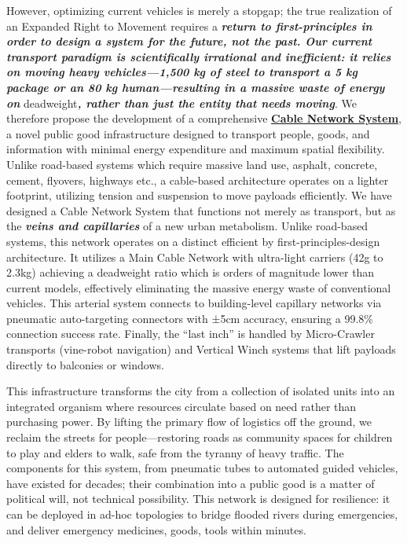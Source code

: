 However, optimizing current vehicles is merely a stopgap; the true
realization of an Expanded Right to Movement requires a
\textbf{\emph{return to first-principles in order to design a system for
the future, not the past. Our current transport paradigm is
scientifically irrational and inefficient: it relies on moving heavy
vehicles---1,500 kg of steel to transport a 5 kg package or an 80 kg
human---resulting in a massive waste of energy on
}}deadweight\textbf{\emph{, rather than just the entity that needs
moving}}. We therefore propose the development of a comprehensive
\href{Y:/extended-human-rights/cable-network}{\textbf{Cable Network
System}}, a novel public good infrastructure designed to transport
people, goods, and information with minimal energy expenditure and
maximum spatial flexibility. Unlike road-based systems which require
massive land use, asphalt, concrete, cement, flyovers, highways etc., a
cable-based architecture operates on a lighter footprint, utilizing
tension and suspension to move payloads efficiently. We have designed a
Cable Network System that functions not merely as transport, but as the
\textbf{\emph{veins and capillaries}} of a new urban metabolism. Unlike
road-based systems, this network operates on a distinct efficient by
first-principles-design architecture. It utilizes a Main Cable Network
with ultra-light carriers (42g to 2.3kg) achieving a deadweight ratio
which is orders of magnitude lower than current models, effectively
eliminating the massive energy waste of conventional vehicles. This
arterial system connects to building-level capillary networks via
pneumatic auto-targeting connectors with ±5cm accuracy, ensuring a
99.8\% connection success rate. Finally, the ``last inch'' is handled by
Micro-Crawler transports (vine-robot navigation) and Vertical Winch
systems that lift payloads directly to balconies or windows.

This infrastructure transforms the city from a collection of isolated
units into an integrated organism where resources circulate based on
need rather than purchasing power. By lifting the primary flow of
logistics off the ground, we reclaim the streets for people---restoring
roads as community spaces for children to play and elders to walk, safe
from the tyranny of heavy traffic. The components for this system, from
pneumatic tubes to automated guided vehicles, have existed for decades;
their combination into a public good is a matter of political will, not
technical possibility. This network is designed for resilience: it can
be deployed in ad-hoc topologies to bridge flooded rivers during
emergencies, and deliver emergency medicines, goods, tools within
minutes.

